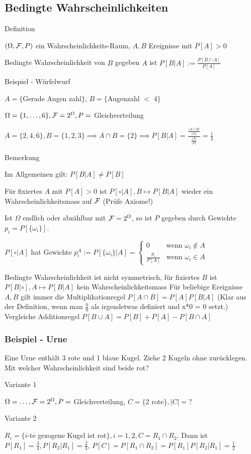\subsection{Bedingte Wahrscheinlichkeiten}
\enumstart
	\item Definition
	\enumstart
		\item $(\Omega, \mathcal{F}, P)$ ein Wahrscheinlichkeits-Raum, $A, B$ Ereignisse mit $P[A] > 0$
		\item Bedingte Wahrscheinlichkeit von $B$ gegeben $A$ ist $P[B | A] := \frac{P[B \cap A]}{P[A]}$
		\item Beispiel - Würfelwurf
		\enumstart
			\item $A = \{$Gerade Augen zahl$\}$, $B = \{$Augenzahl  $<$ 4$\}$
			\item $\Omega = \{1, \mathellipsis, 6\}, \mathcal{F} = 2^\Omega, P =$ Gleichverteilung
			\item $A = \{2,4,6\}, B = \{1,2,3\} \implies A \cap B = \{2\} \implies P[B | A] = \frac{\frac{|A \cap B|}{|\Omega|}}{\frac{|A|}{|\Omega|}} = \frac{1}{3}$
		\enumend
	\enumend
	\item Bemerkung
	\enumstart
		\item Im Allgemeinen gilt: $P[B | A] \ne P[B]$
		\item Für fixiertes $A$ mit $P[A] > 0$ ist $P[\circ |A], B \mapsto P[B | A]$ wieder ein Wahrscheinlichkeitsmass auf $\mathcal{F}$ (Prüfe Axiome!)
		\item Ist $\Omega$ endlich oder abzählbar mit $\mathcal{F} = 2^\Omega$, so ist $P$ gegeben durch Gewichte $p_i = P[\{\omega_i\}]$.
		\item $P[\circ | A]$ hat Gewichte $p_i^A := P[\{\omega_i\} | A] = \begin{cases} 0 &\text{wenn }\omega_i \notin A\\\frac{p_i}{P[A]} &\text{wenn } \omega_i \in A \end{cases}$
		\item Bedingte Wahrscheinlichkeit ist nicht symmetrisch, für fixiertes $B$ ist $P[B | \circ], A \mapsto P[B | A]$ kein Wahrscheinlichkeitsmass
	\enumend
\enumend
Für beliebige Ereignisse $A, B$ gilt immer die Multiplikationregel $P[A \cap B] = P[A]P[B | A]$ (Klar aus der Definition, wenn man $\frac{0}{0}$ als irgendetwas definiert und x*0 = 0 setzt.)\\
Vergleiche Additionregel $P[B \cup A] = P[B] + P[A] - P[B \cap A]$
\subsubsection{Beispiel - Urne}
\enumstart
	\item Eine Urne enthält 3 rote und 1 blaue Kugel. Ziehe 2 Kugeln ohne zurücklegen. Mit welcher Wahrscheinlichkeit sind beide rot?
	\item Variante 1
	\enumstart
		\item $\Omega = \mathellipsis, \mathcal{F} = 2^\Omega, P =$ Gleichverteilung, $C = \{$2 rote$\}, |C| = ?$
	\enumend
	\item Variante 2
	\enumstart
		\item $R_i = \{i$-te gezogene Kugel ist rot$\}, i = 1, 2, C = R_1 \cap R_2.$ Dann ist $P[R_1] = \frac{3}{4}, P[R_2 | R_1] = \frac{2}{3}$, $P[C] = P[R_1 \cap R_2] = P[R_1]P[R_2 | R_1] = \frac{1}{2}$
	\enumend
\enumend

